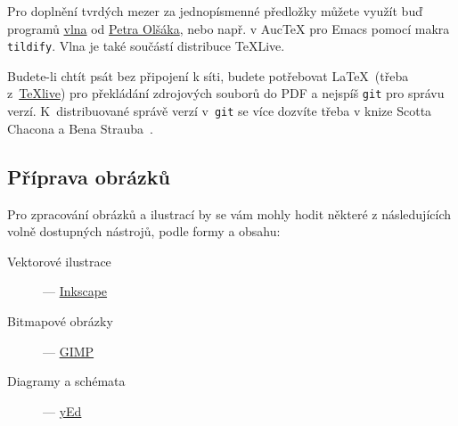 Pro doplnění tvrdých mezer za jednopísmenné předložky můžete využít buď programů \href{https://petr.olsak.net/ftp/olsak/vlna/}{vlna} od \href{https://petr.olsak.net/}{Petra Olšáka}, nebo např. v AucTeX pro Emacs pomocí makra \texttt{tildify}. Vlna je také součástí distribuce TeXLive.

Budete-li chtít psát bez připojení k síti, budete potřebovat \LaTeX\ (třeba z~\href{https://tug.org/texlive/}{TeXlive}) pro překládání zdrojových souborů do PDF a nejspíš \verb?git? pro správu verzí. K~distribuované správě verzí v~\verb?git? se více dozvíte třeba v knize Scotta Chacona a Bena Strauba~\cite{chacon_pro_2014}.

\subsection{Příprava obrázků}
\label{sec:obrazky}

Pro zpracování obrázků a ilustrací by se vám mohly hodit některé z následujících volně dostupných nástrojů, podle formy a obsahu:
\begin{description}
\item[Vektorové ilustrace] --- \href{https://inkscape.org/cs/}{Inkscape}
\item[Bitmapové obrázky] --- \href{https://gimp.org/}{GIMP}
\item[Diagramy a schémata] --- \href{https://www.yworks.com/products/yed}{yEd}
\end{description}


